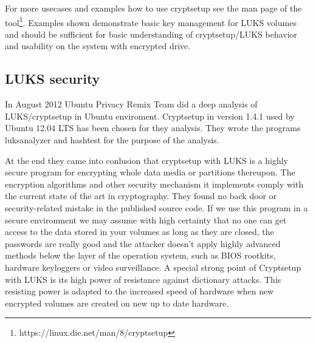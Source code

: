 For more usecases and examples how to use cryptsetup see the man page of the tool\footnote{https://linux.die.net/man/8/cryptsetup}.
Examples shown demonstrate basic key management for LUKS volumes and should be sufficient for basic understanding of cryptsetup/LUKS behavior and usability on the system with encrypted drive.

\subsection{LUKS security}

In August 2012 Ubuntu Privacy Remix Team did a deep analysis of LUKS/cryptsetup in Ubuntu enviroment.
Cryptsetup in version 1.4.1 used by Ubuntu 12.04 LTS has been chosen for they analysis.
They wrote the programs luksanalyzer and hashtest for the purpose of the analysis.

At the end they came into conlusion that cryptsetup with LUKS is a highly secure program for encrypting whole data media or partitions thereupon.
The encryption algorithms and other security mechanism it implements comply with the current state of the art in cryptography.
They found no back door or security-related mistake in the published source code.
If we use this program in a secure environment we may assume with high certainty that no one can get access to the data stored in your volumes as long as they are closed, the passwords are really good and the attacker doesn't apply highly advanced methods below the layer of the operation system, such as BIOS rootkits, hardware keyloggers or video surveillance.
A special strong point of Cryptsetup with LUKS is its high power of resistance against dictionary attacks.
This resisting power is adapted to the increased speed of hardware when new encrypted volumes are created on new up to date hardware\cite{team2012security}.
